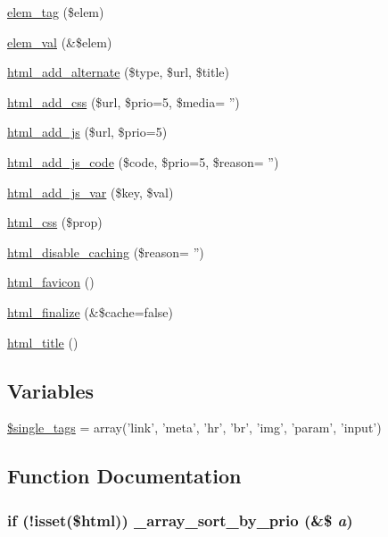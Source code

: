 \begin{CompactItemize}
\hyperlink{html_8inc_8php_158c5e6dccf734bc8c035e6bcd0a446f}{elem\_\-tag} (\$elem)
\item 
\hyperlink{html_8inc_8php_e28d850c3c906c6884462ca89c06f59b}{elem\_\-val} (\&\$elem)
\item 
\hyperlink{html_8inc_8php_e013e8f0bdd681184ee1873a1964c454}{html\_\-add\_\-alternate} (\$type, \$url, \$title)
\item 
\hyperlink{html_8inc_8php_962ef1b29e909a38b9a7b79086d54ab2}{html\_\-add\_\-css} (\$url, \$prio=5, \$media= '')
\item 
\hyperlink{html_8inc_8php_450214704e1bbc2e8849abb54db38a03}{html\_\-add\_\-js} (\$url, \$prio=5)
\item 
\hyperlink{html_8inc_8php_90601d141e5751c07b61f32f623ed7d2}{html\_\-add\_\-js\_\-code} (\$code, \$prio=5, \$reason= '')
\item 
\hyperlink{html_8inc_8php_84769b7fe7b5454ff46534d0577eb54c}{html\_\-add\_\-js\_\-var} (\$key, \$val)
\item 
\hyperlink{html_8inc_8php_d52276fa2a03df7342ba4b8e6a334ce0}{html\_\-css} (\$prop)
\item 
\hyperlink{html_8inc_8php_b0dafe79ee61164014b0a4d8b4112dbb}{html\_\-disable\_\-caching} (\$reason= '')
\item 
\hyperlink{html_8inc_8php_5738adf9b56d1ff2b8d02977ed7929ce}{html\_\-favicon} ()
\item 
\hyperlink{html_8inc_8php_405dc7e3718d4196c05087057ebf69bf}{html\_\-finalize} (\&\$cache=false)
\item 
\hyperlink{html_8inc_8php_3f572f51a815fe19c590fea7d6d3a1a6}{html\_\-title} ()
\end{CompactItemize}
\subsection*{Variables}
\begin{CompactItemize}
\item 
\hyperlink{html_8inc_8php_0a733c7a281726a879f13e7325881887}{\$single\_\-tags} = array('link', 'meta', 'hr', 'br', 'img', 'param', 'input')
\end{CompactItemize}


\subsection{Function Documentation}
\hypertarget{html_8inc_8php_7fb2b386b2bae219112628971275c225}{
\subsubsection[{\_\-array\_\-sort\_\-by\_\-prio}]{\setlength{\rightskip}{0pt plus 5cm}if (!isset(\$html)) \_\-array\_\-sort\_\-by\_\-prio (\&\$ {\em a})}}
\label{html_8inc_8php_7fb2b386b2bae219112628971275c225}


